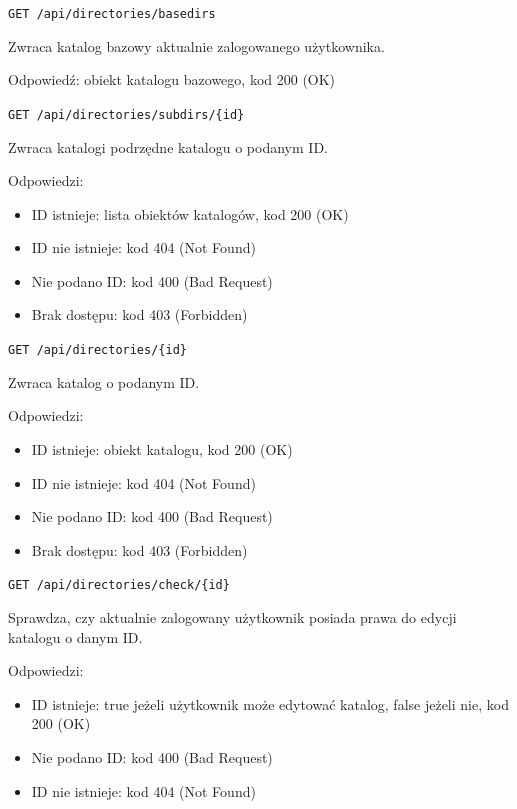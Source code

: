 \documentclass[a4paper,twoside,12pt]{book}
\begin{document}
\texttt{GET\ /api/directories/basedirs}

Zwraca katalog bazowy aktualnie zalogowanego użytkownika.

Odpowiedź: obiekt katalogu bazowego, kod 200 (OK)

\label{get-directories-by-parent-id}

\texttt{GET\ /api/directories/subdirs/\{id\}}

Zwraca katalogi podrzędne katalogu o podanym ID.

Odpowiedzi: 
\begin{itemize}
	\item ID istnieje: lista obiektów katalogów, kod 200 (OK) 
	\item ID nie istnieje: kod 404 (Not Found) 
	\item Nie podano ID: kod 400 (Bad Request)
	\item Brak dostępu: kod 403 (Forbidden)
\end{itemize}

\label{get-directory-by-id}

\texttt{GET\ /api/directories/\{id\}}

Zwraca katalog o podanym ID.

Odpowiedzi: 
\begin{itemize}
	\item ID istnieje: obiekt katalogu, kod 200 (OK) 
	\item ID nie istnieje: kod 404 (Not Found) 
	\item Nie podano ID: kod 400 (Bad Request)
	\item Brak dostępu: kod 403 (Forbidden)
\end{itemize}

\label{check-directory-edit-access}

\texttt{GET\ /api/directories/check/\{id\}}

Sprawdza, czy aktualnie zalogowany użytkownik posiada prawa do edycji katalogu o danym ID.

Odpowiedzi: 
\begin{itemize}
	\item ID istnieje: true jeżeli użytkownik może edytować katalog, false jeżeli nie, kod 200 (OK) 
	\item Nie podano ID: kod 400 (Bad Request) 
	\item ID nie istnieje: kod 404 (Not Found)
\end{itemize}
\end{document}
